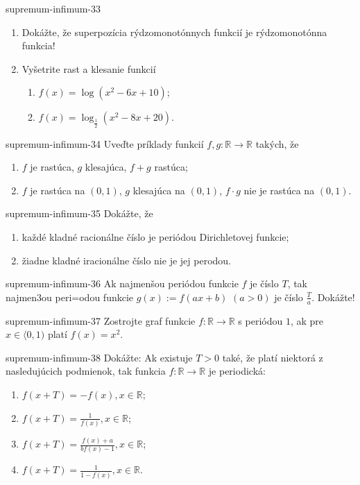 \begin{defproblem}{supremum-infimum-33}
\begin{enumerate}
\item Dokážte, že superpozícia rýdzomonotónnych funkcií je rýdzomonotónna funkcia!
\item Vyšetrite rast a klesanie funkcií
\begin{enumerate}
\item $f(x)=\log (x^2-6x+10)$;
\item $f(x)=\log_\frac{1}{2}(x^2-8x+20)$.
\end{enumerate}
\end{enumerate}
\end{defproblem}

\begin{defproblem}{supremum-infimum-34}
Uveďte príklady funkcií $f,g:\mathbb{R}\rightarrow\mathbb{R}$ takých, že
\begin{enumerate}
\item $f$ je rastúca, $g$ klesajúca, $f+g$ rastúca;
\item $f$ je rastúca na $(0,1)$, $g$ klesajúca na $(0,1)$, $f\cdot g$ nie je rastúca na $(0,1)$.
\end{enumerate}
\end{defproblem}

\begin{defproblem}{supremum-infimum-35}
Dokážte, že
\begin{enumerate}
\item každé kladné racionálne číslo je periódou Dirichletovej funkcie;
\item žiadne kladné iracionálne číslo nie je jej perodou.
\end{enumerate}
\end{defproblem}

\begin{defproblem}{supremum-infimum-36}
Ak najmenšou periódou funkcie $f$ je číslo $T$, tak najmen3ou peri=odou funkcie $g(x):=f(ax+b)$ $(a>0)$ je číslo $\frac{T}{a}$. Dokážte!
\end{defproblem}

\begin{defproblem}{supremum-infimum-37}
Zostrojte graf funkcie $f:\mathbb{R}\rightarrow\mathbb{R}$ s periódou $1$, ak pre $x\in\langle 0,1)$ platí $f(x)=x^2$.
\end{defproblem}

\begin{defproblem}{supremum-infimum-38}
Dokážte: Ak existuje $T>0$ také, že platí niektorá z nasledujúcich podmienok, tak funkcia $f:\mathbb{R}\rightarrow\mathbb{R}$ je periodická:
\begin{multicols}{2}
\begin{enumerate}
    \item $f(x+T)=-f(x),x\in\mathbb{R}$;
    \item $f(x+T)=\frac{1}{f(x)},x\in\mathbb{R}$;
    \item $f(x+T)=\frac{f(x)+a}{bf(x)-1},x\in\mathbb{R}$;
    \item $f(x+T)=\frac{1}{1-f(x)},x\in\mathbb{R}$.
\end{enumerate}
\end{multicols}
\end{defproblem}

